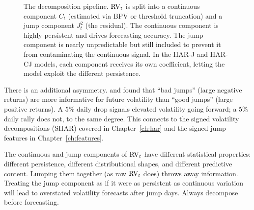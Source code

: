 \begin{figure}[htbp]
\caption{The decomposition pipeline.
$\operatorname{RV}_t$ is split into a continuous component $C_t$ (estimated via BPV or threshold truncation) and a jump component $J_t^2$ (the residual).
The continuous component is highly persistent and drives forecasting accuracy.
The jump component is nearly unpredictable but still included to prevent it from contaminating the continuous signal.
In the HAR-J and HAR-CJ models, each component receives its own coefficient, letting the model exploit the different persistence.}
\label{fig:decomposition-pipeline}
\end{figure}

There is an additional asymmetry.
\citet{BKT2015} and \citet{PSS2015} found that ``bad jumps'' (large negative returns) are more informative for future volatility than ``good jumps'' (large positive returns).
A 5\% daily drop signals elevated volatility going forward; a 5\% daily rally does not, to the same degree.
This connects to the signed volatility decompositions (SHAR) covered in Chapter~\ref{ch:har} and the signed jump features in Chapter~\ref{ch:features}.

\begin{warning}
The continuous and jump components of $\operatorname{RV}_t$ have different statistical properties: different persistence, different distributional shapes, and different predictive content.
Lumping them together (as raw $\operatorname{RV}_t$ does) throws away information.
Treating the jump component as if it were as persistent as continuous variation will lead to overstated volatility forecasts after jump days.
Always decompose before forecasting.
\end{warning}



